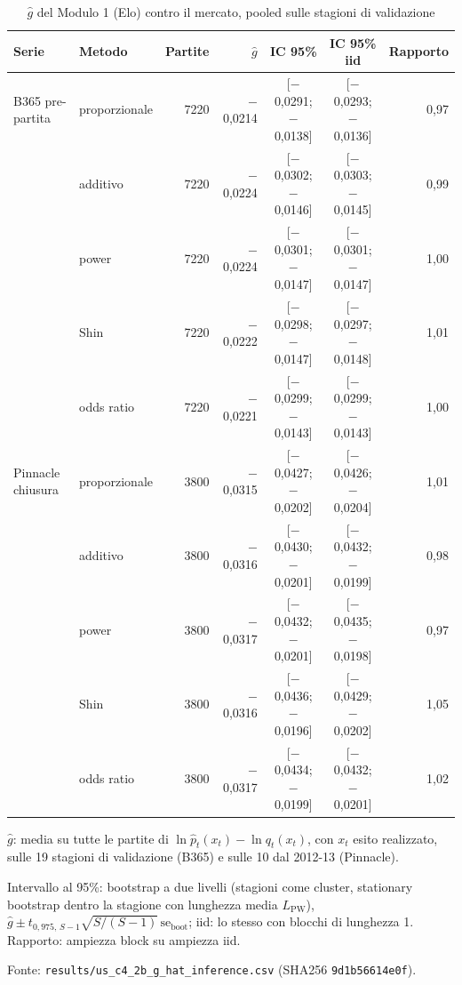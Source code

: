 \begin{table}[htbp]
\centering
\small
\caption{$\hat g$ del Modulo 1 (Elo) contro il mercato, pooled sulle stagioni di validazione}
\label{tab:g_hat}
\begin{tabular}{llrrccr}
\toprule
Serie & Metodo & Partite & $\hat g$ & IC 95\% & IC 95\% iid & Rapporto \\
\midrule
B365 pre-partita & proporzionale & 7220 & $-$0,0214 & [$-$0,0291; $-$0,0138] & [$-$0,0293; $-$0,0136] & 0,97 \\
 & additivo & 7220 & $-$0,0224 & [$-$0,0302; $-$0,0146] & [$-$0,0303; $-$0,0145] & 0,99 \\
 & power & 7220 & $-$0,0224 & [$-$0,0301; $-$0,0147] & [$-$0,0301; $-$0,0147] & 1,00 \\
 & Shin & 7220 & $-$0,0222 & [$-$0,0298; $-$0,0147] & [$-$0,0297; $-$0,0148] & 1,01 \\
 & odds ratio & 7220 & $-$0,0221 & [$-$0,0299; $-$0,0143] & [$-$0,0299; $-$0,0143] & 1,00 \\
\midrule
Pinnacle chiusura & proporzionale & 3800 & $-$0,0315 & [$-$0,0427; $-$0,0202] & [$-$0,0426; $-$0,0204] & 1,01 \\
 & additivo & 3800 & $-$0,0316 & [$-$0,0430; $-$0,0201] & [$-$0,0432; $-$0,0199] & 0,98 \\
 & power & 3800 & $-$0,0317 & [$-$0,0432; $-$0,0201] & [$-$0,0435; $-$0,0198] & 0,97 \\
 & Shin & 3800 & $-$0,0316 & [$-$0,0436; $-$0,0196] & [$-$0,0429; $-$0,0202] & 1,05 \\
 & odds ratio & 3800 & $-$0,0317 & [$-$0,0434; $-$0,0199] & [$-$0,0432; $-$0,0201] & 1,02 \\
\bottomrule
\end{tabular}

\smallskip
\begin{minipage}{\linewidth}
\footnotesize
$\hat g$: media su tutte le partite di $\ln \hat p_t(x_t) - \ln q_t(x_t)$, con $x_t$ esito realizzato, sulle 19 stagioni di validazione (B365) e sulle 10 dal 2012-13 (Pinnacle).\par
Intervallo al 95\%: bootstrap a due livelli (stagioni come cluster, stationary bootstrap dentro la stagione con lunghezza media $L_{\mathrm{PW}}$), $\hat g \pm t_{0{,}975,\,S-1}\sqrt{S/(S-1)}\,\mathrm{se}_{\mathrm{boot}}$; iid: lo stesso con blocchi di lunghezza 1. Rapporto: ampiezza block su ampiezza iid.\par
Fonte: \texttt{results/us\_c4\_2b\_g\_hat\_inference.csv} (SHA256 \texttt{9d1b56614e0f}).
\end{minipage}
\end{table}
